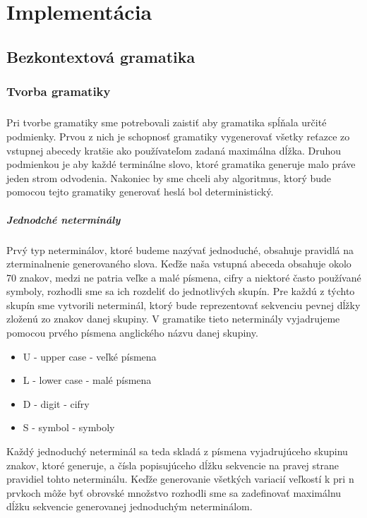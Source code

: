 \chapter{Implementácia}

\section{Bezkontextová gramatika}
\subsection{Tvorba gramatiky}
\paragraph{}
Pri tvorbe gramatiky sme potrebovali zaistiť aby gramatika spĺňala určité podmienky. Prvou z nich je schopnosť gramatiky vygenerovať všetky reťazce zo vstupnej abecedy kratšie ako používateľom zadaná maximálna dĺžka. Druhou podmienkou je aby každé terminálne slovo, ktoré gramatika generuje malo práve jeden strom odvodenia. Nakoniec by sme chceli aby algoritmus, ktorý bude pomocou tejto gramatiky generovať heslá bol deterministický.

\paragraph{Jednodché neterminály}
Prvý typ neterminálov, ktoré budeme nazývať jednoduché, obsahuje pravidlá na zterminalnenie generovaného slova. Keďže naša vstupná abeceda obsahuje okolo 70 znakov, medzi ne patria veľke a malé písmena, cifry a niektoré často používané symboly, rozhodli sme sa ich rozdeliť do jednotlivých skupín. Pre každú z týchto skupín sme vytvorili neterminál, ktorý bude reprezentovať sekvenciu pevnej dĺžky zloženú zo znakov danej skupiny. V gramatike tieto neterminály vyjadrujeme pomocou prvého písmena anglického názvu danej skupiny.
\begin{itemize}
	\item U - upper case - veľké písmena
	\item L - lower case - malé písmena
	\item D - digit - cifry
	\item S - symbol - symboly
\end{itemize}
Každý jednoduchý neterminál sa teda skladá z písmena vyjadrujúceho skupinu znakov, ktoré generuje, a čísla popisujúceho dĺžku sekvencie na pravej strane pravidiel tohto neterminálu. Keďže generovanie všetkých variacií veľkostí k pri n prvkoch môže byť obrovské množstvo rozhodli sme sa zadefinovať maximálnu dĺžku sekvencie generovanej jednoduchým neterminálom.

